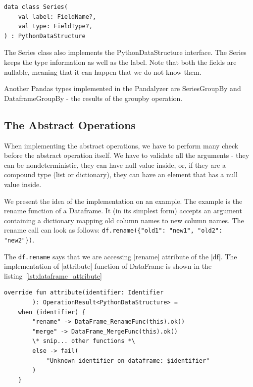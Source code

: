 \begin{lstlisting}[caption=Kotlin definition of the Series, label={lst:series_definition}, captionpos=b]
data class Series(
    val label: FieldName?,
    val type: FieldType?,
) : PythonDataStructure
\end{lstlisting}

The Series class also implements the PythonDataStructure interface.
The Series keeps the type information as well as the label.
Note that both the fields are nullable, meaning that it can happen that we do not know them.

Another Pandas types implemented in the Pandalyzer are SeriesGroupBy and DataframeGroupBy - the results of the groupby
operation.

\subsection{The Abstract Operations}\label{subsec:the-abstract-operations}

When implementing the abstract operations, we have to perform many check before the abstract operation itself.
We have to validate all the arguments - they can be nondeterministic, they can have null value inside, or, if they are
a compound type (list or dictionary), they can have an element that has a null value inside.

We present the idea of the implementation on an example.
The example is the rename function of a Dataframe.
It (in its simplest form) accepts an argument containing a dictionary mapping old column names to new column names.
The rename call can look as follows: \verb|df.rename({"old1": "new1", "old2": "new2"})|.

The \verb|df.rename| says that we are accessing |rename| attribute of the |df|.
The implementation of |attribute| function of DataFrame is shown in the listing~\ref{lst:dataframe_attribute}

\begin{lstlisting}[caption=Snippet of attribute function of Dataframe, label={lst:dataframe_attribute}, captionpos=b]
override fun attribute(identifier: Identifier
        ): OperationResult<PythonDataStructure> =
    when (identifier) {
        "rename" -> DataFrame_RenameFunc(this).ok()
        "merge" -> DataFrame_MergeFunc(this).ok()
        \* snip... other functions *\
        else -> fail(
            "Unknown identifier on dataframe: $identifier"
        )
    }
\end{lstlisting}

